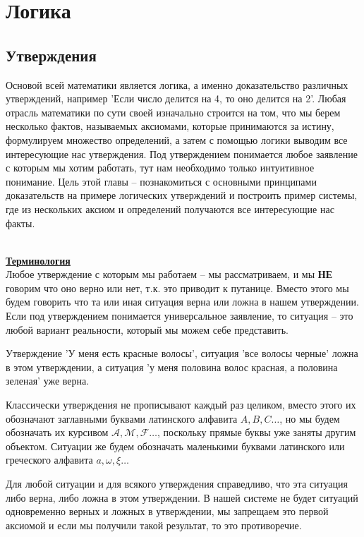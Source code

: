 
\chapter{Логика}
\section{Утверждения}
Основой всей математики является логика, а именно доказательство различных утверждений, например 'Если число делится на 4, то оно делится на 2'. Любая отрасль математики по сути своей изначально строится на том, что мы берем несколько фактов, называемых аксиомами, которые принимаются за истину, формулируем множество определений, а затем с помощью логики выводим все интересующие нас утверждения. Под утверждением понимается любое заявление с которым мы хотим работать, тут нам необходимо только интуитивное понимание.
Цель этой главы -- познакомиться с основными принципами доказательств на примере логических утверждений и построить пример системы, где из нескольких аксиом и определений получаются все интересующие нас факты.

\quad \\
\underline{\textbf{Терминология}} \\

Любое утверждение с которым мы работаем -- мы рассматриваем, и мы \textbf{НЕ} говорим что оно верно или нет, т.к. это приводит к путанице. Вместо этого мы будем говорить что та или иная ситуация верна или ложна в нашем утверждении. Если под утверждением понимается универсальное заявление, то ситуация -- это любой вариант реальности, который мы можем себе представить.
\begin{example}
Утверждение 'У меня есть красные волосы', ситуация 'все волосы черные' ложна в этом утверждении, а ситуация 'у меня половина волос красная, а половина зеленая' уже верна.
\end{example}

Классически утверждения не прописывают каждый раз целиком, вместо этого их обозначают заглавными буквами латинского алфавита $ A,B,C \ldots $, но мы будем обозначать их курсивом $\mathcal{A}, \mathcal{M}, \mathcal{F} \ldots $, поскольку прямые буквы уже заняты другим объектом.
Ситуации же будем обозначать маленькими буквами латинского или греческого алфавита $ a, \omega, \xi \ldots $ \\

\begin{axiom}
Для любой ситуации и для всякого утверждения справедливо, что эта ситуация либо верна, либо ложна в этом утверждении.
В нашей системе не будет ситуаций одновременно верных и ложных в утверждении, мы запрещаем это первой аксиомой и если мы получили такой результат, то это противоречие.
\end{axiom}

